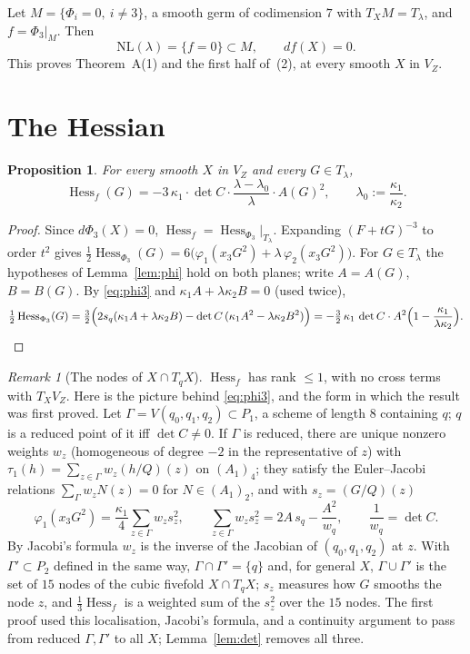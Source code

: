 \documentclass[10pt]{article}
\numberwithin{equation}{section}
\newtheorem{proposition}[theorem]{Proposition}
\theoremstyle{remark}
\newtheorem{remark}[theorem]{Remark}
\newcommand{\NL}{\mathrm{NL}}
\newcommand{\VZ}{V_Z}
\newcommand{\Hess}{\operatorname{Hess}}
\begin{document}
Let $M=\{\Phi_i=0,\ i\neq3\}$, a smooth germ of codimension $7$ with $T_XM=T_\lambda$, and $f=\Phi_3|_M$. Then
\begin{equation}\label{eq:f}
\NL(\lambda)=\{f=0\}\subset M,\qquad df(X)=0 .
\end{equation}
This proves Theorem~A(1) and the first half of~(2), at every smooth $X$ in $\VZ$.

\section{The Hessian}\label{sec:hessian}
\begin{proposition}\label{prop:hess}
For every smooth $X$ in $\VZ$ and every $G\in T_\lambda$,
\begin{equation}\label{eq:hess}
\Hess_f(G)=-3\,\kappa_1\cdot\det C\cdot\frac{\lambda-\lambda_0}{\lambda}\cdot A(G)^2,\qquad
\lambda_0:=\frac{\kappa_1}{\kappa_2}.
\end{equation}
\end{proposition}
\begin{proof}
Since $d\Phi_3(X)=0$, $\Hess_f=\Hess_{\Phi_3}|_{T_\lambda}$. Expanding $(F+tG)^{-3}$ to order $t^2$ gives
$\tfrac12\Hess_{\Phi_3}(G)=6\bigl(\varphi_1(x_3G^2)+\lambda\,\varphi_2(x_3G^2)\bigr)$. For $G\in T_\lambda$ the
hypotheses of Lemma~\ref{lem:phi} hold on both planes; write $A=A(G)$, $B=B(G)$. By \eqref{eq:phi3} and
$\kappa_1A+\lambda\kappa_2B=0$ (used twice),
\begin{equation}\label{eq:h4}
\tfrac12\Hess_{\Phi_3}(G)=\tfrac32\Bigl(2s_q(\kappa_1A+\lambda\kappa_2B)-\det C\,(\kappa_1A^2-\lambda\kappa_2B^2)\Bigr)
=-\tfrac32\,\kappa_1\,\det C\cdot A^2\Bigl(1-\frac{\kappa_1}{\lambda\kappa_2}\Bigr).\qedhere
\end{equation}
\end{proof}

\begin{remark}[The nodes of $X\cap T_qX$]\label{rem:nodes}
$\Hess_f$ has rank $\le1$, with no cross terms with $T_X\VZ$. Here is the picture behind \eqref{eq:phi3}, and
the form in which the result was first proved. Let $\Gamma=V(q_0,q_1,q_2)\subset P_1$, a scheme of length $8$
containing $q$; $q$ is a reduced point of it iff $\det C\ne0$. If $\Gamma$ is reduced, there are unique nonzero
weights $w_z$ (homogeneous of degree $-2$ in the representative of $z$) with
$\tau_1(h)=\sum_{z\in\Gamma}w_z(h/Q)(z)$ on $(A_1)_4$; they satisfy the Euler--Jacobi
relations $\sum_\Gamma w_zN(z)=0$ for $N\in(A_1)_2$, and with $s_z=(G/Q)(z)$
\[
\varphi_1(x_3G^2)=\frac{\kappa_1}4\sum_{z\in\Gamma}w_zs_z^2,\qquad
\sum_{z\in\Gamma}w_zs_z^2=2A\,s_q-\frac{A^2}{w_q},\qquad \frac1{w_q}=\det C .
\]
By Jacobi's formula $w_z$ is the inverse of the Jacobian of $(q_0,q_1,q_2)$ at $z$. With $\Gamma'\subset P_2$
defined in the same way, $\Gamma\cap\Gamma'=\{q\}$ and, for general $X$, $\Gamma\cup\Gamma'$ is the set of $15$
nodes of the cubic fivefold $X\cap T_qX$; $s_z$ measures how $G$ smooths the node $z$, and $\frac13\Hess_f$ is a
weighted sum of the $s_z^2$ over the $15$ nodes. The first proof used this localisation, Jacobi's formula, and a
continuity argument to pass from reduced $\Gamma,\Gamma'$ to all $X$; Lemma~\ref{lem:det} removes all three.
\end{remark}
\end{document}
